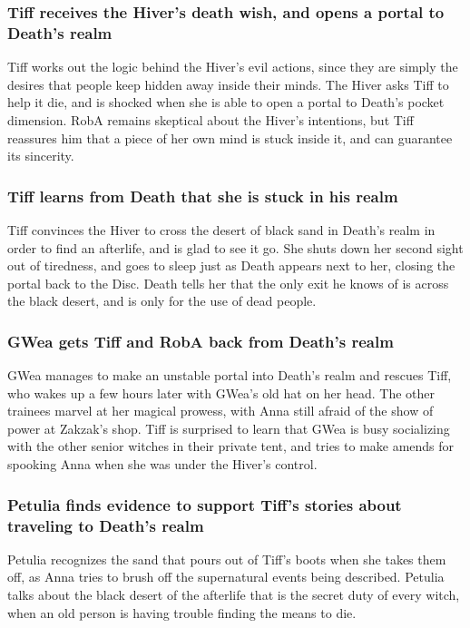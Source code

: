\subsubsection{\Gls{Tiff} receives the \Gls{Hiver}'s death wish, and opens a portal to \Gls{Death}'s
    realm}
\Gls{Tiff} works out the logic behind the \Gls{Hiver}'s evil actions, since they are simply the
desires that people keep hidden away inside their minds. The \Gls{Hiver} asks \Gls{Tiff} to help it
die, and is shocked when she is able to open a portal to \Gls{Death}'s pocket dimension. \Gls{RobA}
remains skeptical about the \Gls{Hiver}'s intentions, but \Gls{Tiff} reassures him that a piece of
her own mind is stuck inside it, and can guarantee its sincerity.

\subsubsection{\Gls{Tiff} learns from \Gls{Death} that she is stuck in his realm}
\Gls{Tiff} convinces the \Gls{Hiver} to cross the desert of black sand in \Gls{Death}'s realm in
order to find an afterlife, and is glad to see it go. She shuts down her second sight out of
tiredness, and goes to sleep just as \Gls{Death} appears next to her, closing the portal back to the
Disc. \Gls{Death} tells her that the only exit he knows of is across the black desert, and is only
for the use of dead people.

\subsubsection{\Gls{GWea} gets \Gls{Tiff} and \Gls{RobA} back from \Gls{Death}'s realm}
\Gls{GWea} manages to make an unstable portal into \Gls{Death}'s realm and rescues \Gls{Tiff},
who wakes up a few hours later with \Gls{GWea}'s old hat on her head. The other trainees marvel at
her magical prowess, with \Gls{Anna} still afraid of the show of power at \Gls{Zakzak}'s shop.
\Gls{Tiff} is surprised to learn that \Gls{GWea} is busy socializing with the other senior witches
in their private tent, and tries to make amends for spooking \Gls{Anna} when she was under the
\Gls{Hiver}'s control.

\subsubsection{\Gls{Petulia} finds evidence to support \Gls{Tiff}'s stories about traveling to
    \Gls{Death}'s realm}
\Gls{Petulia} recognizes the sand that pours out of \Gls{Tiff}'s boots when she takes them off, as
\Gls{Anna} tries to brush off the supernatural events being described. \Gls{Petulia} talks about
the black desert of the afterlife that is the secret duty of every witch, when an old person is
having trouble finding the means to die.

